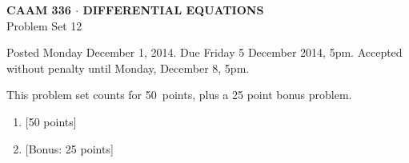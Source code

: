 \documentclass[10pt]{article}
\begin{document}
\begin{center}
\large \textsf{\textbf{CAAM 336 $\cdot$ DIFFERENTIAL EQUATIONS}\\[0.5em]
 Problem Set 12 }
\end{center}

Posted Monday December 1, 2014.  Due Friday 5 December 2014, 5pm.  Accepted without penalty until Monday, December 8, 5pm.  

\begin{center}
This problem set counts for 50~points, plus a 25 point bonus problem.\\
\end{center}


\begin{enumerate}
\item {[50 points]}\\ 

\newpage
\item {[Bonus: 25 points]} 

\end{enumerate}
\end{document}
